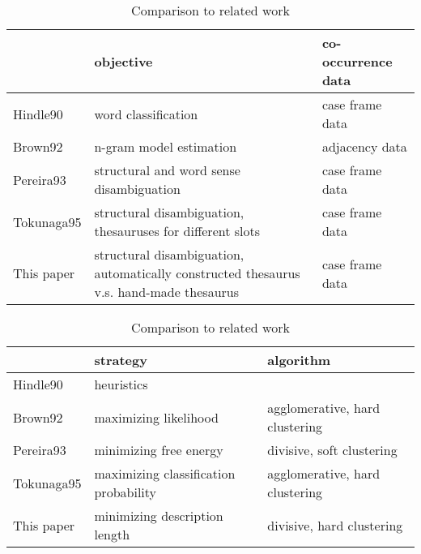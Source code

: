 \begin{table*}[htb]
\caption{Comparison to related work}
\label{tb:comp1}
\begin{center}
\begin{tabular}{|l|p{7cm}|l|} \hline
 & objective & co-occurrence data \\ \hline
Hindle90 & word classification & case frame data \\
Brown92 & n-gram model estimation & adjacency data \\
Pereira93 & structural and word sense disambiguation & case
frame data \\
Tokunaga95 & structural disambiguation, thesauruses for
different slots & case frame data \\
This paper & structural disambiguation, automatically constructed
thesaurus v.s. hand-made thesaurus & case frame data \\ \hline 
\end{tabular}
\end{center} 
\end{table*}

\begin{table*}[htb]
\caption{Comparison to related work}
\label{tb:comp2}
\begin{center}
\begin{tabular}{|l|l|l|} \hline
 & strategy & algorithm \\ \hline
Hindle90 & heuristics & \\
Brown92 & maximizing likelihood & agglomerative, hard
clustering \\
Pereira93 & minimizing free energy & divisive, soft clustering \\
Tokunaga95 & maximizing classification probability &
agglomerative, hard clustering \\
This paper & minimizing description length & divisive, hard clustering \\ \hline 
\end{tabular}
\end{center} 
\end{table*}

